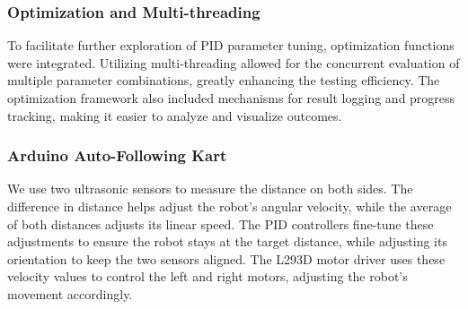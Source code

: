\documentclass[a4paper,12pt]{article}
\begin{document}
\subsubsection{Optimization and Multi-threading}
To facilitate further exploration of PID parameter tuning, optimization functions were integrated. Utilizing multi-threading allowed for the concurrent evaluation of multiple parameter combinations, greatly enhancing the testing efficiency. The optimization framework also included mechanisms for result logging and progress tracking, making it easier to analyze and visualize outcomes.
\subsubsection{Arduino Auto-Following Kart}
We use two ultrasonic sensors to measure the distance on both sides. The difference in distance helps adjust the robot's angular velocity, while the average of both distances adjusts its linear speed. The PID controllers fine-tune these adjustments to ensure the robot stays at the target distance, while adjusting its orientation to keep the two sensors aligned. The L293D motor driver uses these velocity values to control the left and right motors, adjusting the robot's movement accordingly.
\end{document}
